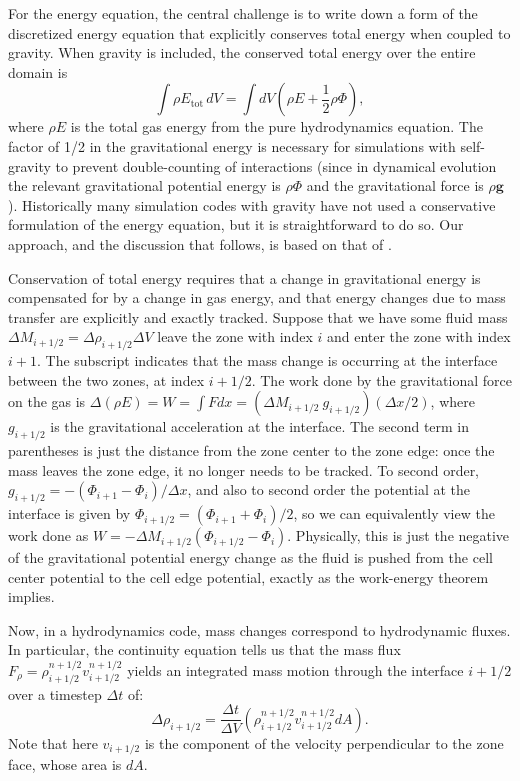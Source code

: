 \documentclass[12pt]{article}
\begin{document}
For the energy equation, the central challenge is to write down a form of the 
discretized energy equation that explicitly conserves total energy when 
coupled to gravity. When gravity is included, the conserved total energy
over the entire domain is
\begin{equation}
  \int \rho E_{\text{tot}}\, dV = \int dV \left(\rho E + \frac{1}{2}\rho\Phi\right), \label{eq:total_energy_gravity}
\end{equation}
where $\rho E$ is the total gas energy from the pure hydrodynamics equation. 
The factor of 1/2 in the gravitational energy is necessary for simulations with
self-gravity to prevent double-counting of interactions (since in dynamical evolution
the relevant gravitational potential energy is $\rho \Phi$ and the gravitational force
is $\rho \mathbf{g}$). Historically many simulation codes with gravity have not used
a conservative formulation of the energy equation, but it is straightforward to do so.
Our approach, and the discussion that follows, is based on that of \cite{arepo}.

Conservation of total energy requires that a change in gravitational energy is compensated
for by a change in gas energy, and that energy changes due to mass transfer are explicitly and 
exactly tracked. Suppose that we have some fluid mass $\Delta M_{i+1/2} = \Delta \rho_{i+1/2} \Delta V$ leave the zone
with index $i$ and enter the zone with index $i+1$. The subscript indicates that the mass change is
occurring at the interface between the two zones, at index $i+1/2$. The work done by the gravitational
force on the gas is $\Delta (\rho E) = W = \int F dx = (\Delta M_{i+1/2}\ g_{i+1/2}) (\Delta x / 2)$,
where $g_{i+1/2}$ is the gravitational acceleration at the interface. The second term in parentheses
is just the distance from the zone center to the zone edge: once the mass leaves the zone edge, it no longer
needs to be tracked. To second order, $g_{i+1/2} = -(\Phi_{i+1} - \Phi_{i}) / \Delta x$, and also to second order the potential
at the interface is given by $\Phi_{i+1/2} = (\Phi_{i+1} + \Phi_i) / 2$, so we can equivalently view the work done
as $W = -\Delta M_{i+1/2} (\Phi_{i+1/2} - \Phi_i)$. Physically, this is just the negative of the gravitational
potential energy change as the fluid is pushed from the cell center potential to the cell edge potential,
exactly as the work-energy theorem implies. 

Now, in a hydrodynamics code, mass changes correspond to hydrodynamic fluxes. In particular,
the continuity equation tells us that the mass flux $F_\rho = \rho^{n+1/2}_{i+1/2} v^{n+1/2}_{i+1/2}$ yields
an integrated mass motion through the interface $i+1/2$ over a timestep $\Delta t$ of:
\begin{equation}
  \Delta \rho_{i+1/2} = \frac{\Delta t}{\Delta V} \left(\rho^{n+1/2}_{i+1/2} v^{n+1/2}_{i+1/2} dA\right).
\end{equation}
Note that here $v_{i+1/2}$ is the component of the velocity perpendicular to the zone face, whose
area is $dA$.
\end{document}
